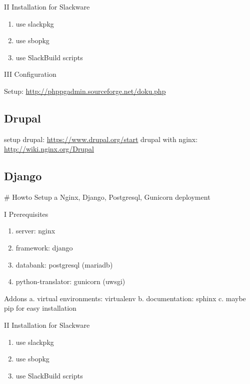 \documentclass[letterpaper,10pt,english]{sphinxmanual}
\begin{document}
II Installation for Slackware
\begin{enumerate}
\item {} 
use slackpkg

\item {} 
use sbopkg

\item {} 
use SlackBuild scripts

\end{enumerate}

III Configuration

Setup: \href{http://phppgadmin.sourceforge.net/doku.php}{http://phppgadmin.sourceforge.net/doku.php}


\subsection{Drupal}
\label{sdocs/drupal/drupal:drupal}\label{sdocs/drupal/drupal::doc}
setup drupal: \href{https://www.drupal.org/start}{https://www.drupal.org/start}
drupal with nginx: \href{http://wiki.nginx.org/Drupal}{http://wiki.nginx.org/Drupal}


\subsection{Django}
\label{sdocs/django/django::doc}\label{sdocs/django/django:django}
\# Howto Setup a Nginx, Django, Postgresql, Gunicorn deployment

I Prerequisites
\begin{enumerate}
\item {} 
server: nginx

\item {} 
framework: django

\item {} 
databank: postgresql (mariadb)

\item {} 
python-translator: gunicorn (uwsgi)

\end{enumerate}

Addons
a. virtual environments: virtualenv
b. documentation: sphinx
c. maybe pip for easy installation

II Installation for Slackware
\begin{enumerate}
\item {} 
use slackpkg

\item {} 
use sbopkg

\item {} 
use SlackBuild scripts

\end{enumerate}
\end{document}
